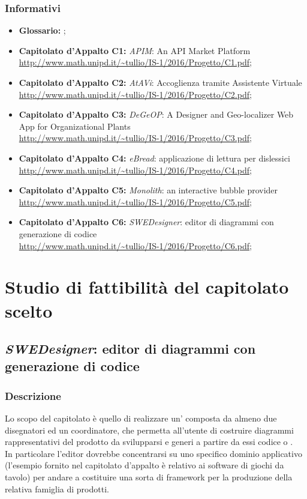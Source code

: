 		\subsubsection{Informativi}
		\begin{itemize}
			\item \textbf{Glossario: }\emph{\Glossario};
			\item \textbf{Capitolato d'Appalto C1:} \emph{APIM}: An API Market Platform
			\\ \url{http://www.math.unipd.it/~tullio/IS-1/2016/Progetto/C1.pdf};
			\item \textbf{Capitolato d'Appalto C2:} \emph{AtAVi}: Accoglienza tramite Assistente Virtuale
			\\ \url{http://www.math.unipd.it/~tullio/IS-1/2016/Progetto/C2.pdf};
			\item \textbf{Capitolato d'Appalto C3:} \emph{DeGeOP}: A Designer and Geo-localizer Web App for Organizational Plants
			\\ \url{http://www.math.unipd.it/~tullio/IS-1/2016/Progetto/C3.pdf};
			\item \textbf{Capitolato d'Appalto C4:} \emph{eBread}: applicazione di lettura per dislessici
			\\ \url{http://www.math.unipd.it/~tullio/IS-1/2016/Progetto/C4.pdf};
			\item \textbf{Capitolato d'Appalto C5:} \emph{Monolith}: an interactive bubble provider
			\\ \url{http://www.math.unipd.it/~tullio/IS-1/2016/Progetto/C5.pdf};
			\item \textbf{Capitolato d'Appalto C6:} \emph{SWEDesigner}: editor di diagrammi  con generazione di codice
			\\ \url{http://www.math.unipd.it/~tullio/IS-1/2016/Progetto/C6.pdf};
		\end{itemize}
\newpage
	
\section{Studio di fattibilità del capitolato scelto}
	\subsection{\emph{SWEDesigner}: editor di diagrammi  con generazione di codice}
		\subsubsection{Descrizione}
		Lo scopo del capitolato è quello di realizzare un' composta da almeno due disegnatori
		ed un coordinatore, che permetta all'utente di costruire diagrammi  rappresentativi del prodotto da svilupparsi e generi a partire da essi codice 
		 o .
		\\In particolare l'editor dovrebbe concentrarsi su uno specifico dominio applicativo (l'esempio fornito nel capitolato d'appalto è relativo ai software 
		di giochi da tavolo) per andare a costituire una sorta di framework per la produzione della relativa famiglia di prodotti.
